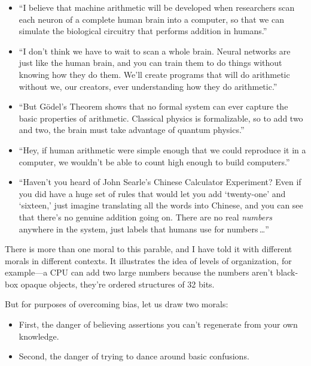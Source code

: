 \begin{itemize}
\item {
 ``I believe that machine arithmetic will be
developed when researchers scan each neuron of a complete human brain
into a computer, so that we can simulate the biological circuitry that
performs addition in humans.''}

\item {
 ``I don't think we have to wait
to scan a whole brain. Neural networks are just like the human brain,
and you can train them to do things without knowing how they do them.
We'll create programs that will do arithmetic without
we, our creators, ever understanding how they do
arithmetic.''}

\item {
 ``But Gödel's Theorem shows that
no formal system can ever capture the basic properties of arithmetic.
Classical physics is formalizable, so to add two and two, the brain
must take advantage of quantum physics.''}

\item {
 ``Hey, if human arithmetic were simple enough
that we could reproduce it in a computer, we wouldn't
be able to count high enough to build computers.''}

\item {
 ``Haven't you heard of John
Searle's Chinese Calculator Experiment? Even if you did
have a huge set of rules that would let you add
`twenty-one' and
`sixteen,' just imagine translating all
the words into Chinese, and you can see that there's no
genuine addition going on. There are no real \textit{numbers} anywhere
in the system, just labels that humans use for numbers\,\ldots''}
\end{itemize}


 There is more than one moral to this parable, and I have told it
with different morals in different contexts. It illustrates the idea of
levels of organization, for example---a CPU can add two large numbers
because the numbers aren't black-box opaque objects,
they're ordered structures of 32 bits.


 But for purposes of overcoming bias, let us draw two morals:

\begin{itemize}
\item {
 First, the danger of believing assertions you
can't regenerate from your own knowledge.}

\item {
  Second, the danger of trying to dance around basic confusions.}
\end{itemize}


